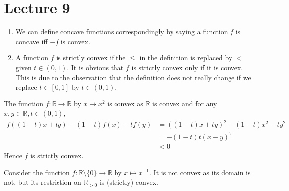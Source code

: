 \documentclass[a4paper]{article}
\begin{document}
\part*{Lecture 9}
\begin{remark}
    \begin{enumerate}
        \item We can define concave functions correspondingly by saying a function $f$ is concave iff $-f$ is convex.
        \item A function $f$ is strictly convex if the $\le$ in the definition is replaced by $<$ given $t\in (0,1)$.
        It is obvious that $f$ is strictly convex only if it is convex.
        This is due to the observation that the definition does not really change if we replace $t\in[0,1]$ by $t\in(0,1)$.
    \end{enumerate}
\end{remark}
\begin{example}
    The function $f:\mathbb R\to\mathbb R$ by $x\mapsto x^2$ is convex as $\mathbb R$ is convex and for any $x,y\in\mathbb R,t\in (0,1)$,
    \begin{align*}
        f((1-t)x+ty)-(1-t)f(x)-tf(y)&=((1-t)x+ty)^2-(1-t)x^2-ty^2\\
        &=-(1-t)t(x-y)^2\\
        &<0
    \end{align*}
    Hence $f$ is strictly convex.
\end{example}
\begin{example}
    Consider the function $f:\mathbb R\setminus\{0\}\to\mathbb R$ by $x\mapsto x^{-1}$.
    It is not convex as its domain is not, but its restriction on $\mathbb R_{>0}$ is (strictly) convex.
\end{example}
\end{document}
